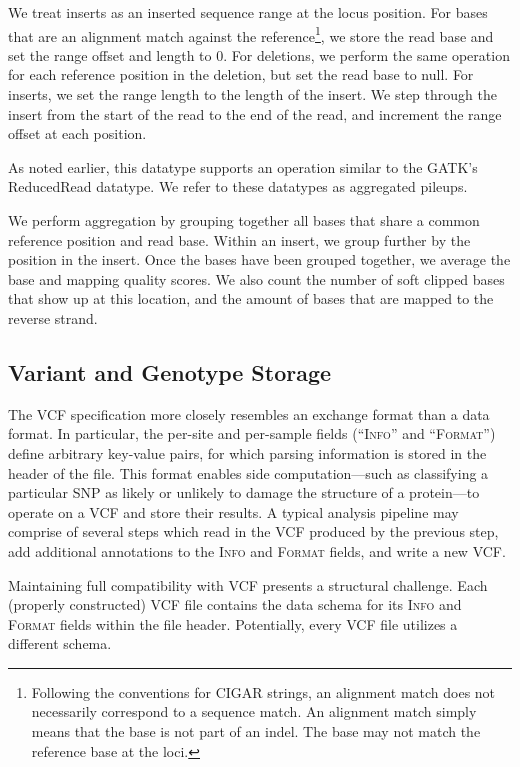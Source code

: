 \documentclass[10pt,twocolumn]{article}
\theoremstyle{plain}
\begin{document}
We treat inserts as an inserted sequence range at the locus position. For bases that are an alignment match against the
reference\footnote{Following the conventions for CIGAR strings, an alignment match does not necessarily correspond to
a sequence match. An alignment match simply means that the base is not part of an indel. The base may not match the
reference base at the loci.}, we store the read base and set the range offset and length to 0. For deletions, we perform the
same operation for each reference position in the deletion, but set the read base to null. For inserts, we set the range length
to the length of the insert. We step through the insert from the start of the read to the end of the read, and increment the
range offset at each position.

As noted earlier, this datatype supports an operation similar to the GATK's ReducedRead datatype. We refer to these datatypes
as aggregated pileups. 

We perform aggregation by grouping together all bases that share a common reference position and
read base. Within an insert, we group further by the position in the insert. Once the bases have been grouped together, we average
the base and mapping quality scores. We also count the number of soft clipped bases that show up at this location, and the amount
of bases that are mapped to the reverse strand.

\subsection{Variant and Genotype Storage}
\label{sec:variant-and-genotype-storage}

The VCF specification more closely resembles an exchange format than a data format. In particular, the per-site and per-sample fields
(``\textsc{Info}'' and ``\textsc{Format}'') define arbitrary key-value pairs, for which parsing information is stored in the header of the file.
This format enables side computation---such as classifying a particular SNP as likely or unlikely to damage the structure of a protein---to operate on a VCF
and store their results. A typical analysis pipeline may comprise of several steps which read in the VCF produced by the previous step, add
additional annotations to the \textsc{Info} and \textsc{Format} fields, and write a new VCF.

Maintaining full compatibility with VCF presents a structural challenge. Each (properly constructed) VCF file contains the data schema for
its \textsc{Info} and \textsc{Format} fields within the file header. Potentially, every VCF file utilizes a different schema. 
\end{document}
